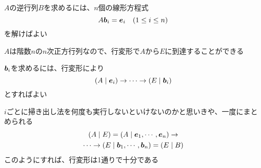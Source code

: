 \documentclass[../../../topic_linear-algebra]{subfiles}
\begin{document}
$A$の逆行列$B$を求めるには、$n$個の線形方程式
\begin{equation*}
  A\vb*{b}_i = \vb*{e}_i \quad ( 1    \leq i \leq n )
\end{equation*}
を解けばよい

\br

$A$は階数$n$の$n$次正方行列なので、行変形で$A$から$E$に到達することができる

\br

$\vb*{b}_i$を求めるには、行変形により
\begin{equation*}
  (A \mid \vb*{e}_i) \rightarrow \cdots \rightarrow (E \mid \vb*{b}_i)
\end{equation*}
とすればよい

\br

$i$ごとに掃き出し法を何度も実行しないといけないのかと思いきや、一度にまとめられる
\begin{gather*}
  (A \mid E) = (A \mid \vb*{e}_1, \cdots , \vb*{e}_n) \rightarrow \\ \cdots \rightarrow (E \mid \vb*{b}_1 , \cdots , \vb*{b}_n) = (E \mid B)
\end{gather*}
このようにすれば、行変形は1通りで十分である
\end{document}
